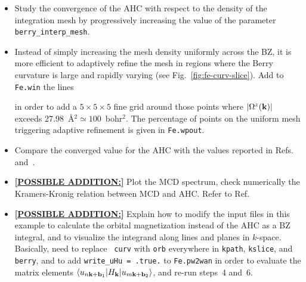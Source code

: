 \documentclass[a4paper,11pt,twoside]{article}
\begin{document}
\begin{itemize}
\item Study the convergence of the AHC with respect to the density of
  the integration mesh by progressively increasing the value of the
  parameter {\tt berry\_interp\_mesh}.

\item Instead of simply increasing the mesh density uniformly across
  the BZ, it is more efficient to adaptively refine the mesh in
  regions where the Berry curvature is large and rapidly varying (see
  Fig.~\ref{fig:fe-curv-slice}).  Add to {\tt Fe.win} the lines

in order to add a $5\times 5\times 5$ fine grid around those points
where $\vert\Omega^z({\bf k})\vert$ exceeds 27.98~\AA$^2\simeq
100$~bohr$^2$. The percentage of points on the uniform mesh triggering
adaptive refinement is given in {\tt Fe.wpout}.

\item Compare the converged value for the AHC with the values reported
in Refs.~\cite{wang-prb06} and~\cite{yao-prl04}.

\item {\bf [\underline{POSSIBLE ADDITION:}]} Plot the MCD spectrum,
  check numerically the Kramers-Kronig relation between MCD and AHC.
Refer to Ref.~\cite{WanInt}


\item {\bf [\underline{POSSIBLE ADDITION:}]} Explain how to modify the
  input files in this example to calculate the orbital magnetization
  instead of the AHC as a BZ integral, and to visualize the integrand
  along lines and planes in $k$-space. Basically, need to replace {\tt
    curv} with {\tt orb} everywhere in {\tt kpath}, {\tt kslice}, and
  {\tt berry}, and to add {\tt write\_uHu = .true.} to {\tt Fe.pw2wan}
  in order to evaluate the matrix elements $\langle u_{n{\bf k}+{\bf
      b}_1}\vert H_{\bf k}\vert u_{m{\bf k}+{\bf b}_2}\rangle$, and
  re-run steps~4 and~6.

\end{itemize}

\cleardoublepage
\end{document}
